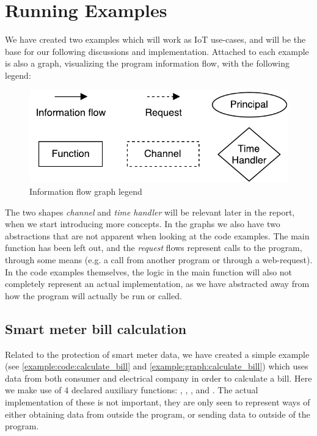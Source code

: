 
\section{Running Examples}\label{examples:sec}
We have created two examples which will work as IoT use-cases, and will be the base for our following discussions and implementation.
Attached to each example is also a graph, visualizing the program information flow, with the following legend:
\begin{figure}[H]
  \centering
  \includegraphics[scale=0.8]{figures/dlm_legend}
  \caption{Information flow graph legend}
  \label{example:legend}
\end{figure}
The two shapes \emph{channel} and \emph{time handler} will be relevant later in the report, when we start introducing more concepts.
In the graphs we also have two abstractions that are not apparent when looking at the code examples.
The main function has been left out, and the \emph{request} flows represent calls to the program, through some means (e.g. a call from another program or through a web-request).
In the code examples themselves, the logic in the main function will also not completely represent an actual implementation, as we have abstracted away from how the program will actually be run or called.

\subsection{Smart meter bill calculation}
Related to the protection of smart meter data, we have created a simple example (see \cref{example:code:calculate_bill} and \cref{example:graph:calculate_bill}) which uses data from both consumer and electrical company in order to calculate a bill.
Here we make use of 4 declared auxiliary functions: , , , and .
The actual implementation of these is not important, they are only seen to represent ways of either obtaining data from outside the program, or sending data to outside of the program.

